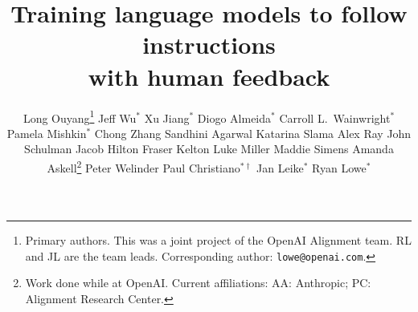 \usepackage{xpatch}
\makeatletter
{}
\makeatother

\usepackage{natbib}
\usepackage{apalike}
\usepackage{array}


\title{Training language models to follow instructions\\ with human feedback}

\author{%
  Long Ouyang\thanks{Primary authors. This was a joint project of the OpenAI Alignment team. RL and JL are the team leads. Corresponding author: \texttt{lowe@openai.com}.
  } 
  \And 
  Jeff Wu$^*$
  \And 
  Xu Jiang$^*$  
  \And
  Diogo Almeida$^*$
  \And 
  Carroll L.~Wainwright$^*$
  \And 
  Pamela Mishkin$^*$
  \And 
  Chong Zhang
  \And
  Sandhini Agarwal
  \And
  Katarina Slama
  \And
  Alex Ray
  \And
  John Schulman
  \And
  Jacob Hilton
  \And
  Fraser Kelton
  \And
  Luke Miller
  \And
  Maddie Simens
  \And
  Amanda Askell\thanks{Work done while at OpenAI. Current affiliations: AA: Anthropic; PC: Alignment Research Center.}
  \And
  Peter Welinder
  \And 
  Paul Christiano$^{*\dagger}$
  \AND
  Jan Leike$^*$
  \And
  Ryan Lowe$^*$
  \AND
}



\maketitle





